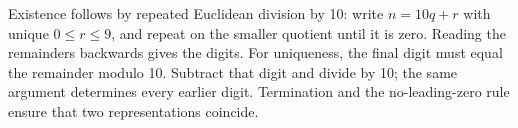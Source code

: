 Existence follows by repeated Euclidean division by 10: write $n=10q+r$ with unique $0\le r\le9$, and repeat on the smaller quotient until it is zero. Reading the remainders backwards gives the digits. For uniqueness, the final digit must equal the remainder modulo 10. Subtract that digit and divide by 10; the same argument determines every earlier digit. Termination and the no-leading-zero rule ensure that two representations coincide.

